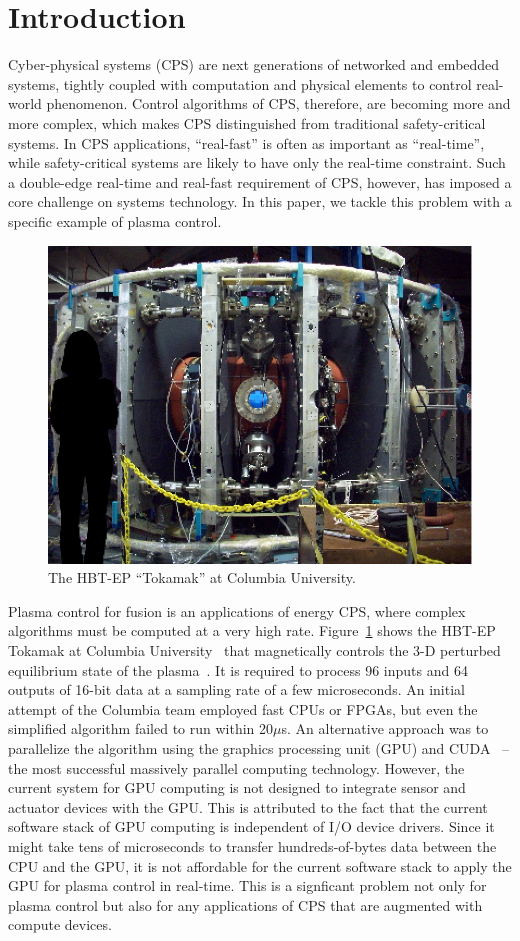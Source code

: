 \section{Introduction}
\label{sec:introduction}

Cyber-physical systems (CPS) are next generations of networked and
embedded systems, tightly coupled with computation and physical
elements to control real-world phenomenon.
Control algorithms of CPS, therefore, are becoming more and more
complex, which makes CPS distinguished from traditional safety-critical
systems.
In CPS applications, ``real-fast'' is often as important as ``real-time'',
while safety-critical systems are likely to have only the real-time
constraint. 
Such a double-edge real-time and real-fast requirement of CPS, however,
has imposed a core challenge on systems technology.
In this paper, we tackle this problem with a specific example of plasma
control.

\begin{figure}[tb]
 \centering
 \includegraphics[width=0.8\hsize]{eps/tokamak.eps}
 \caption{The HBT-EP ``Tokamak'' at Columbia University.}
 \label{fig:tokamak}
\end{figure}

Plasma control for fusion is an applications of energy CPS, where
complex algorithms must be computed at a very high rate.
Figure~\ref{fig:tokamak} shows the HBT-EP Tokamak at Columbia
University~\cite{Maurer_PPCF11,Rath_FED12} that magnetically controls
the 3-D perturbed equilibrium state of the plasma~\cite{Boozer_PP99}.
It is required to process 96 inputs and 64 outputs of 16-bit data at a
sampling rate of a few microseconds.
An initial attempt of the Columbia team employed fast CPUs or FPGAs, but
even the simplified algorithm failed to run within 20$\mu$s.
An alternative approach was to parallelize the algorithm using the
graphics processing unit (GPU) and CUDA~\cite{CUDA} -- the most
successful massively parallel computing technology.
However, the current system for GPU computing is not designed to
integrate sensor and actuator devices with the GPU.
This is attributed to the fact that the current software stack
of GPU computing is independent of I/O device drivers.
Since it might take tens of microseconds to transfer hundreds-of-bytes
data between the CPU and the GPU, it is not affordable for the current
software stack to apply the GPU for plasma control in real-time.
This is a signficant problem not only for plasma control but also for
any applications of CPS that are augmented with compute devices.

